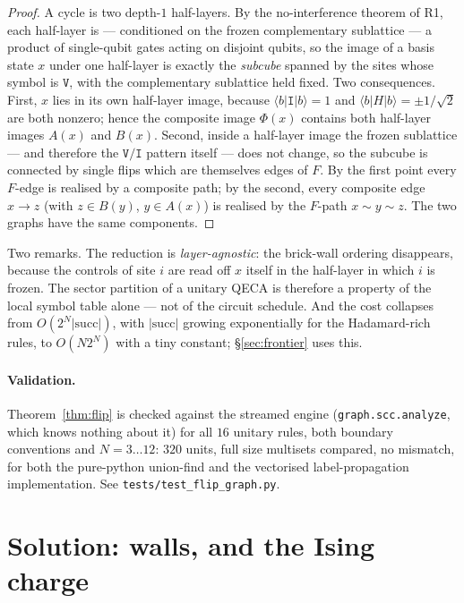 \documentclass[11pt]{article}
\newcommand{\rt}[1]{\texttt{#1}}
\newcommand{\fn}[1]{\texttt{#1}}
\providecommand{\ket}[1]{|#1\rangle}
\providecommand{\bra}[1]{\langle #1|}
\theoremstyle{plain}
\theoremstyle{definition}
\begin{document}
\begin{proof}
A cycle is two depth-$1$ half-layers. By the no-interference theorem of R1, each
half-layer is --- conditioned on the frozen complementary sublattice --- a
product of single-qubit gates acting on disjoint qubits, so the image of a basis
state $x$ under one half-layer is exactly the \emph{subcube} spanned by the sites
whose symbol is $\rt{V}$, with the complementary sublattice held fixed. Two
consequences. First, $x$ lies in its own half-layer image, because
$\bra{b}\rt{I}\ket{b}=1$ and $\bra{b}H\ket{b}=\pm1/\sqrt2$ are both nonzero;
hence the composite image $\Phi(x)$ contains both half-layer images $A(x)$ and
$B(x)$. Second, inside a half-layer image the frozen sublattice --- and therefore
the $\rt{V}/\rt{I}$ pattern itself --- does not change, so the subcube is
connected by single flips which are themselves edges of $F$. By the first point
every $F$-edge is realised by a composite path; by the second, every composite
edge $x\to z$ (with $z\in B(y)$, $y\in A(x)$) is realised by the $F$-path
$x\sim y \sim z$. The two graphs have the same components.
\end{proof}

Two remarks. The reduction is \emph{layer-agnostic}: the brick-wall ordering
disappears, because the controls of site $i$ are read off $x$ itself in the
half-layer in which $i$ is frozen. The sector partition of a unitary QECA is
therefore a property of the local symbol table alone --- not of the circuit
schedule. And the cost collapses from $O(2^N|\mathrm{succ}|)$, with
$|\mathrm{succ}|$ growing exponentially for the Hadamard-rich rules, to
$O(N2^N)$ with a tiny constant; \S\ref{sec:frontier} uses this.

\paragraph{Validation.} Theorem~\ref{thm:flip} is checked against the streamed
engine (\fn{graph.scc.analyze}, which knows nothing about it) for all $16$
unitary rules, both boundary conventions and $N=3\ldots12$: $320$ units, full
size multisets compared, no mismatch, for both the pure-python union-find and the
vectorised label-propagation implementation. See
\fn{tests/test\_flip\_graph.py}.

\section{Solution: walls, and the Ising charge}
\label{sec:walls}
\end{document}
